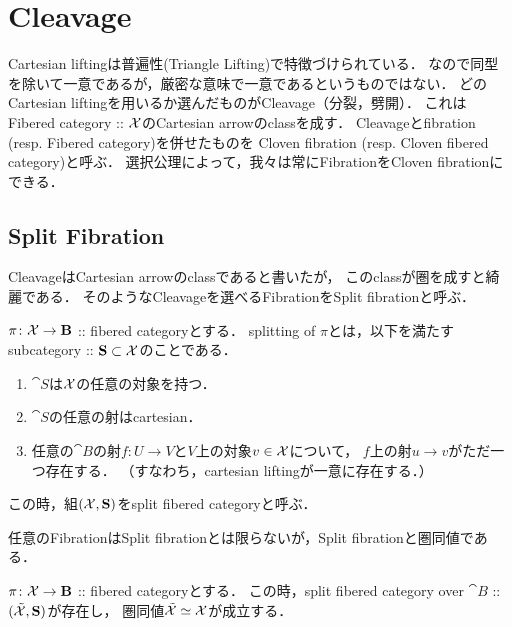 \documentclass[a4paper, dvipdfmx]{jsarticle}
\begin{document}
\section{Cleavage}
    Cartesian liftingは普遍性(Triangle Lifting)で特徴づけられている．
    なので同型を除いて一意であるが，厳密な意味で一意であるというものではない．
    どのCartesian liftingを用いるか選んだものがCleavage（分裂，劈開）．
    これはFibered category :: $\mathcal{X}$のCartesian arrowのclassを成す．
    Cleavageとfibration (resp. Fibered category)を併せたものを
    Cloven fibration (resp. Cloven fibered category)と呼ぶ．
    選択公理によって，我々は常にFibrationをCloven fibrationにできる．

\subsection{ Split Fibration }
    CleavageはCartesian arrowのclassであると書いたが，
    このclassが圏を成すと綺麗である．
    そのようなCleavageを選べるFibrationをSplit fibrationと呼ぶ．

    \begin{Def}
        $\pi \colon \mathcal{X} \to \mathbf{B}$ :: fibered categoryとする．
        splitting of $\pi$とは，以下を満たすsubcategory :: $\mathbf{S} \subset \mathcal{X}$のことである．
        \begin{enumerate}
            \item
                $\cat{S}$は$\mathcal{X}$の任意の対象を持つ．
            \item
                $\cat{S}$の任意の射はcartesian．
            \item
                任意の$\cat{B}$の射$f \colon U \to V$と$V$上の対象$v \in \mathcal{X}$について，
                $f$上の射$u \to v$がただ一つ存在する．
                （すなわち，cartesian liftingが一意に存在する．）
        \end{enumerate}
        この時，組$(\mathcal{X}, \mathbf{S})$をsplit fibered categoryと呼ぶ．
    \end{Def}

    任意のFibrationはSplit fibrationとは限らないが，Split fibrationと圏同値である．

    \begin{Thm}
        $\pi \colon \mathcal{X} \to \mathbf{B}$ :: fibered categoryとする．
        この時，split fibered category over $\cat{B}$ :: $(\tilde{\mathcal{X}}, \mathbf{S})$が存在し，
        圏同値$\tilde{\mathcal{X}} \overset{{}}{\simeq} \mathcal{X}$が成立する．
    \end{Thm}
\end{document}
